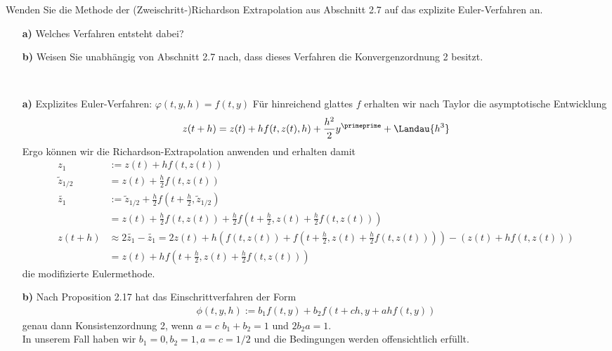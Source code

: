 \begin{exercise}
Wenden Sie die Methode der (Zweischritt-)Richardson Extrapolation aus Abschnitt
2.7 auf das explizite Euler-Verfahren an.
\begin{itemize}
  \item [\textbf{a)}] Welches Verfahren entsteht dabei?
  \item [\textbf{b)}] Weisen Sie unabhängig von Abschnitt 2.7 nach, dass dieses
  Verfahren die Konvergenzordnung 2 besitzt.
\end{itemize}
\end{exercise}
\begin{solution}
\leavevmode \\
\begin{itemize}
  \item [\textbf{a)}] Explizites Euler-Verfahren: $\varphi(t,y,h) = f(t,y)$
  Für hinreichend glattes $f$ erhalten wir nach Taylor die asymptotische Entwicklung
  \begin{align*}
    z(t+h) = z(t) + hf(t,z(t),h) + \frac{h^2}{2}y^{\primeprime} + \Landau{h^3}
  \end{align*}
  Ergo können wir die Richardson-Extrapolation anwenden und erhalten damit
  \begin{align*}
    z_1 &:= z(t) + hf(t,z(t)) \\
    \widetilde{z}_{1/2} &= z(t) + \frac{h}{2}f(t,z(t)) \\
  \widetilde{z_1} &:= \widetilde{z}_{1/2} + \frac{h}{2}f(t + \frac{h}{2},\widetilde{z}_{1/2}) \\
  &= z(t) + \frac{h}{2}f(t,z(t)) + \frac{h}{2}f(t + \frac{h}{2},z(t) + \frac{h}{2}f(t,z(t))) \\
    z(t + h) &\approx 2\widetilde{z_1} - \widetilde{z_1}
    = 2z(t) + h\left(f(t,z(t))+ f(t+\frac{h}{2},z(t)+\frac{h}{2}f(t,z(t)))\right) -
    (z(t) + hf(t,z(t))) \\
    &= z(t) + hf(t+\frac{h}{2},z(t)+\frac{h}{2}f(t,z(t)))
  \end{align*}
  die modifizierte Eulermethode.
  \item [\textbf{b)}] Nach Proposition 2.17 hat das Einschrittverfahren der Form
  \begin{align*}
    \phi(t,y,h) := b_1f(t,y) + b_2f(t+ch,y+ahf(t,y))
  \end{align*}
  genau dann Konsistenzordnung 2, wenn $a = c$ $b_1 + b_2 = 1$ und $2b_2a = 1$. \\
  In unserem Fall haben wir $b_1 = 0, b_2 = 1, a = c = 1/2$ und die Bedingungen
  werden offensichtlich erfüllt.
\end{itemize}
\end{solution}
